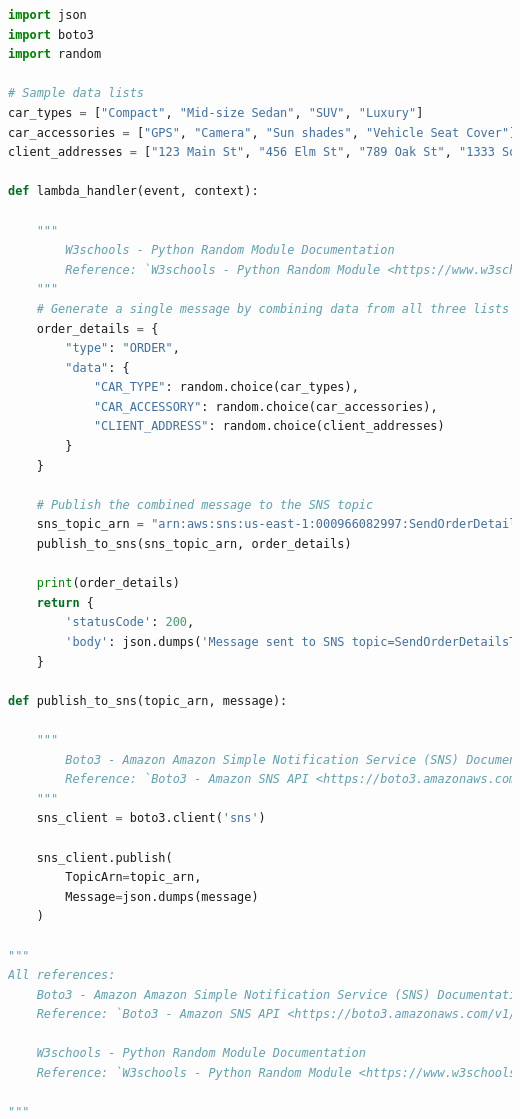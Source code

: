 \begin{enumerate}
\begin{mdframed}[linewidth=1pt]
\lstset{style=mystyle}
\begin{lstlisting}[language=Python]
import json
import boto3
import random

# Sample data lists
car_types = ["Compact", "Mid-size Sedan", "SUV", "Luxury"]
car_accessories = ["GPS", "Camera", "Sun shades", "Vehicle Seat Cover"]
client_addresses = ["123 Main St", "456 Elm St", "789 Oak St", "1333 South park st"]

def lambda_handler(event, context):

    """
        W3schools - Python Random Module Documentation
        Reference: `W3schools - Python Random Module <https://www.w3schools.com/python/module_random.asp>`_
    """
    # Generate a single message by combining data from all three lists
    order_details = {
        "type": "ORDER",
        "data": {
            "CAR_TYPE": random.choice(car_types),
            "CAR_ACCESSORY": random.choice(car_accessories),
            "CLIENT_ADDRESS": random.choice(client_addresses)
        }
    }

    # Publish the combined message to the SNS topic
    sns_topic_arn = "arn:aws:sns:us-east-1:000966082997:SendOrderDetailsToSQS"
    publish_to_sns(sns_topic_arn, order_details)
    
    print(order_details)
    return {
        'statusCode': 200,
        'body': json.dumps('Message sent to SNS topic=SendOrderDetailsToSQS!')
    }

def publish_to_sns(topic_arn, message):

    """
        Boto3 - Amazon Amazon Simple Notification Service (SNS) Documentation
        Reference: `Boto3 - Amazon SNS API <https://boto3.amazonaws.com/v1/documentation/api/latest/reference/services/sns.html>`_
    """
    sns_client = boto3.client('sns')

    sns_client.publish(
        TopicArn=topic_arn,
        Message=json.dumps(message)
    )

"""
All references:
    Boto3 - Amazon Amazon Simple Notification Service (SNS) Documentation
    Reference: `Boto3 - Amazon SNS API <https://boto3.amazonaws.com/v1/documentation/api/latest/reference/services/sns.html>`_

    W3schools - Python Random Module Documentation
    Reference: `W3schools - Python Random Module <https://www.w3schools.com/python/module_random.asp>`_
    
"""

\end{lstlisting}
\end{mdframed}

\end{enumerate}
